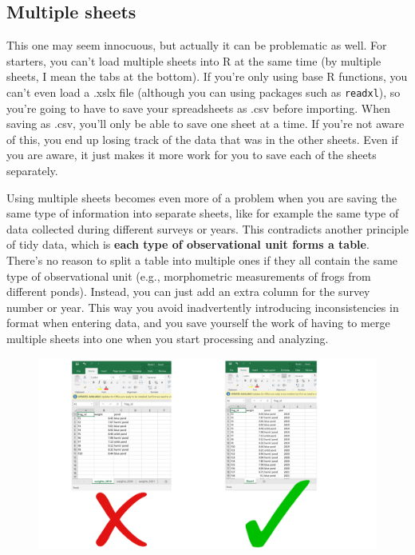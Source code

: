\documentclass[
]{book}
\begin{document}
\hypertarget{multiple-sheets}{%
\subsection{Multiple sheets}\label{multiple-sheets}}

This one may seem innocuous, but actually it can be problematic as well. For starters, you can't load multiple sheets into R at the same time (by multiple sheets, I mean the tabs at the bottom). If you're only using base R functions, you can't even load a .xslx file (although you can using packages such as \texttt{readxl}), so you're going to have to save your spreadsheets as .csv before importing. When saving as .csv, you'll only be able to save one sheet at a time. If you're not aware of this, you end up losing track of the data that was in the other sheets. Even if you are aware, it just makes it more work for you to save each of the sheets separately.

Using multiple sheets becomes even more of a problem when you are saving the same type of information into separate sheets, like for example the same type of data collected during different surveys or years. This contradicts another principle of tidy data, which is \textbf{each type of observational unit forms a table}. There's no reason to split a table into multiple ones if they all contain the same type of observational unit (e.g., morphometric measurements of frogs from different ponds). Instead, you can just add an extra column for the survey number or year. This way you avoid inadvertently introducing inconsistencies in format when entering data, and you save yourself the work of having to merge multiple sheets into one when you start processing and analyzing.

\begin{figure}

{\centering \includegraphics[width=1\linewidth]{img/spreadsheets_04} 

}

\caption{ }\label{fig:ss4}
\end{figure}
\end{document}
